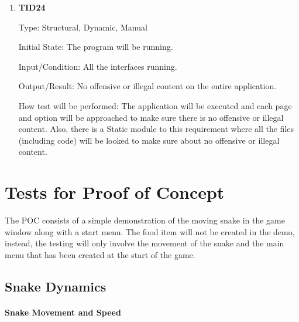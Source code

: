 \documentclass[12pt, titlepage]{article}
\begin{document}
\begin{enumerate}
	
	\item{\textbf{TID24}\\}
	
	Type:  Structural, Dynamic, Manual
	
	Initial State: The program will be running.
	
	Input/Condition: All the interfaces running.
	
	Output/Result: No offensive or illegal content on the entire application.
	
	How test will be performed: The application will be executed and each page and option will be approached to make sure there is no offensive or illegal content. Also, there is a Static module to this requirement where all the files (including code) will be looked to make sure about no offensive or illegal content.
	
\end{enumerate}

\section{Tests for Proof of Concept}

The POC consists of a simple demonstration of the moving snake in the game window along with a start menu. The food item will not be created in the demo, instead, the testing will only involve the movement of the snake and the main menu that has been created at the start of the game.

\subsection{Snake Dynamics}
		
\paragraph{Snake Movement and Speed}
\end{document}
